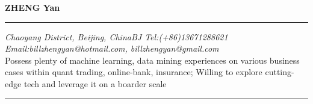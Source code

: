 \documentclass[a4paper,8pt,oneside]{scrartcl}
\makeatletter
\newcommand{\name}{ZHENG Yan}
\newcommand{\addrown}{Chaoyang District, Beijing, China}
\newcommand{\bjphone}{BJ Tel:(+86)13671288621}
\newcommand{\email}{Email:billzhengyan@hotmail.com, billzhengyan@gmail.com}
\newcommand{\Region}{Hong Kong, China}
\newcommand{\bigname}[1]{
    \begin{center}\fontfamily{phv}\selectfont\LARGE\bfseries#1\end{center}
}
\makeatother
\begin{document}
 \selectfont

\bigname{\name}

\vspace{-6pt} \rule{\textwidth}{1pt}

\vspace{-1pt} {\small\itshape \addrown \hfill \bjphone\\
       \email %
\\[5pt]}
Possess plenty of machine learning, data mining experiences on various business cases within quant trading, online-bank, insurance; Willing to explore cutting-edge tech and leverage it on a boarder scale
\\[-5mm]

\rule{\textwidth}{1pt}

\vspace{6pt}
\end{document}
